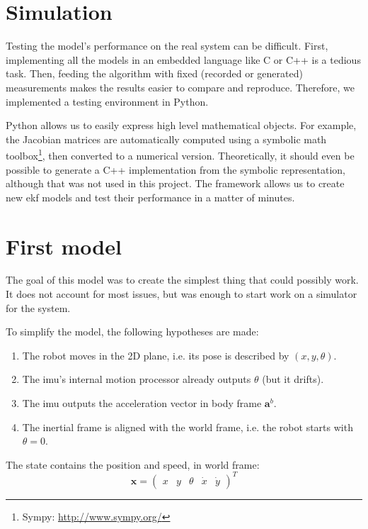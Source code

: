 \documentclass[a4paper, 12pt]{scrreprt}
\begin{document}
\section{Simulation}
\label{sec:simulation}

Testing the model's performance on the real system can be difficult.
First, implementing all the models in an embedded language like C or C++ is a tedious task.
Then, feeding the algorithm with fixed (recorded or generated) measurements makes the results easier to compare and reproduce.
Therefore, we implemented a testing environment in Python.

Python allows us to easily express high level mathematical objects.
For example, the Jacobian matrices are automatically computed using a symbolic math toolbox\footnote{Sympy: \url{http://www.sympy.org/}}, then converted to a numerical version.
Theoretically, it should even be possible to generate a C++ implementation from the symbolic representation, although that was not used in this project.
The framework allows us to create new \gls{ekf} models and test their performance in a matter of minutes.

\section{First model}

The goal of this model was to create the simplest thing that could possibly work.
It does not account for most issues, but was enough to start work on a simulator for the system.

To simplify the model, the following hypotheses are made:
\begin{enumerate}
    \item The robot moves in the 2D plane, i.e. its pose is described by $\left( x, y, \theta \right)$.
    \item The \gls{imu}'s internal motion processor already outputs $\theta$ (but it drifts).
    \item The \gls{imu} outputs the acceleration vector in body frame $\mathbf{a}^b$.
    \item The inertial frame is aligned with the world frame, i.e. the robot starts with $\theta=0$.
\end{enumerate}

The state contains the position and speed, in world frame:
\begin{equation}
    \mathbf{x} = \begin{pmatrix}x & y & \theta & \dot{x} & \dot{y}\end{pmatrix}^T
\end{equation}
\end{document}
